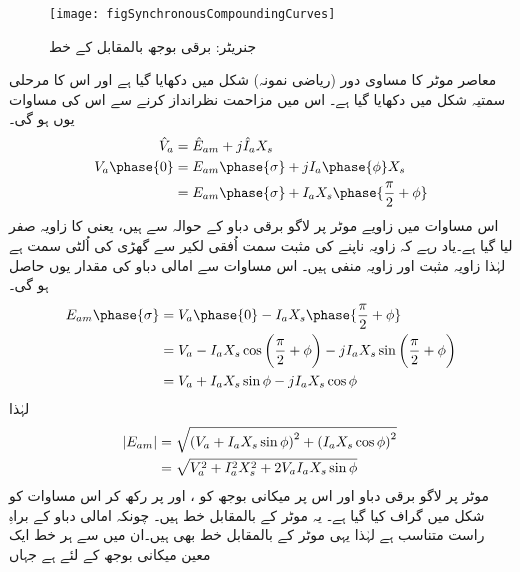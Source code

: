 \begin{figure}
\centering
\texttt{[image: figSynchronousCompoundingCurves]}
\caption{جنریٹر: برقی بوجھ بالمقابل  کے خط}
\label{شکل_معاصر_بار_بالمقابل_میدانی_رو}
\end{figure}
معاصر موٹر کا مساوی دور (ریاضی نمونہ) شکل   میں دکھایا گیا ہے اور اس کا مرحلی سمتیہ شکل   میں دکھایا گیا ہے۔ اس میں مزاحمت نظرانداز کرنے سے اس کی مساوات یوں ہو گی۔
\begin{gather}
\begin{aligned}
\hat{V}_a&=\hat{E}_{am}+j \hat{I}_a X_s\\
V_a \phase{0}&=E_{am} \phase{\sigma} +j I_a \phase{\phi} X_s\\
&=E_{am} \phase{\sigma} +I_a X_s \phase{\frac{\pi}{2}+\phi}
\end{aligned}
\end{gather}
اس مساوات میں زاویے موٹر پر لاگو برقی دباو  کے حوالہ سے ہیں، یعنی   کا زاویہ صفر لیا گیا ہے۔یاد رہے کہ زاویہ ناپنے کی مثبت سمت اُفقی لکیر سے گھڑی کی اُلٹی سمت ہے لہٰذا  زاویہ مثبت اور  زاویہ منفی ہیں۔ اس مساوات سے امالی دباو  کی مقدار یوں حاصل ہو گی۔
\begin{align*}
E_{am}\phase{\sigma}&=V_a \phase{0}-I_a X_s \phase{\frac{\pi}{2}+\phi}\\
&=V_a -I_a X_s  \cos \left( \frac{\pi}{2}+\phi\right)- j I_a X_s \sin \left(\frac{\pi}{2}+\phi \right)\\
&=V_a +I_a X_s \sin \phi-j I_a X_s \cos \phi
\end{align*}
لہٰذا
\begin{gather}
\begin{aligned}\label{مسوات_معاصر_دوری_مساوات}
\abs{E_{am}}&=\sqrt{\left(V_a +I_a X_s \sin \phi \right)^2+\left(I_a X_s \cos \phi \right)^2}\\
&=\sqrt{V_a^2+I_a^2 X_s^2+ 2 V_a I_a X_s \sin \phi}
\end{aligned}
\end{gather}
موٹر پر لاگو برقی دباو اور اس پر میکانی بوجھ کو ،  اور  پر رکھ کر اس مساوات کو شکل    میں  گراف کیا گیا ہے۔ یہ موٹر کے  بالمقابل   خط ہیں۔ چونکہ امالی دباو  کے براہِ راست متناسب ہے لہٰذا یہی موٹر کے  بالمقابل  خط بھی ہیں۔ان میں سے ہر خط ایک معین میکانی بوجھ  کے لئے ہے جہاں
